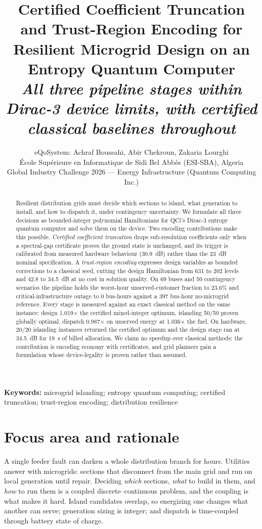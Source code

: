 \documentclass[11pt,twocolumn]{article}
\title{\bfseries Certified Coefficient Truncation and Trust-Region Encoding
for Resilient Microgrid Design on an Entropy Quantum Computer\\[-0.25em]
{\normalsize\itshape All three pipeline stages within Dirac-3 device limits,
with certified classical baselines throughout}}
\author{%
  eQoSystem: Achraf Boussahi, Abir Chekroun, Zakaria Lourghi\\[0.2em]
  {\small \'Ecole Sup\'erieure en Informatique de Sidi Bel Abb\`es (ESI-SBA), Algeria}\\
  {\small Global Industry Challenge 2026 --- Energy Infrastructure (Quantum Computing Inc.)}
}
\date{}
\begin{document}
\maketitle
\begin{abstract}\noindent
Resilient distribution grids must decide which sections to island, what generation to install, and how to dispatch it, under contingency uncertainty. We formulate all three decisions as bounded-integer polynomial Hamiltonians for QCi's Dirac-3 entropy quantum computer and solve them on the device. Two encoding contributions make this possible. {\em Certified coefficient truncation} drops sub-resolution coefficients only when a spectral-gap certificate proves the ground state is unchanged, and its trigger is calibrated from measured hardware behaviour (30.9~dB) rather than the 23~dB nominal specification. A {\em trust-region encoding} expresses design variables as bounded corrections to a classical seed, cutting the design Hamiltonian from 631 to 202 levels and 42.8 to 34.5~dB at no cost in solution quality. On 69 buses and 50 contingency scenarios the pipeline holds the worst-hour unserved-customer fraction to 23.6\% and critical-infrastructure outage to 0 bus-hours against a 397 bus-hour no-microgrid reference. Every stage is measured against an exact classical method on the same instance: design 1.019$\times$ the certified mixed-integer optimum, islanding 50/50 proven globally optimal, dispatch 0.987$\times$ on unserved energy at 1.036$\times$ the fuel. On hardware, 20/20 islanding instances returned the certified optimum and the design stage ran at 34.5~dB for 19~s of billed allocation. We claim no speedup over classical methods; the contribution is encoding economy with certificates, and grid planners gain a formulation whose device-legality is proven rather than assumed.
\end{abstract}
\vspace{0.3em}\noindent\textbf{Keywords:} microgrid islanding; entropy quantum computing; certified truncation; trust-region encoding; distribution resilience

\section{Focus area and rationale}
A single feeder fault can darken a whole distribution branch for hours. Utilities answer with microgrids: sections that disconnect from the main grid and run on local generation until repair. Deciding {\em which} sections, {\em what} to build in them, and {\em how} to run them is a coupled discrete--continuous problem, and the coupling is what makes it hard. Island candidates overlap, so energizing one changes what another can serve; generation sizing is integer; and dispatch is time-coupled through battery state of charge.
\end{document}
